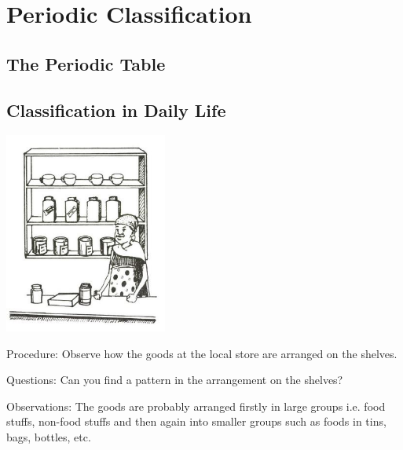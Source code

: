 \section{Periodic Classification}

\begin{multicols}{2}


\section*{The Periodic Table} %


\subsection{Classification in Daily Life}

\begin{center}
\includegraphics[width=0.4\textwidth]{./img/source/classification.jpg}
\end{center}

\begin{description*}
\item[Procedure:]{Observe how the goods at the local store are
arranged on the shelves. }
\item[Questions:]{Can you find a pattern
in the arrangement on the shelves?}
\item[Observations:]{The goods
are probably arranged firstly in large groups i.e.
food stuffs, non-food stuffs and then again into
smaller groups such as foods in tins, bags,
bottles, etc.}
\end{description*}


\end{multicols}
